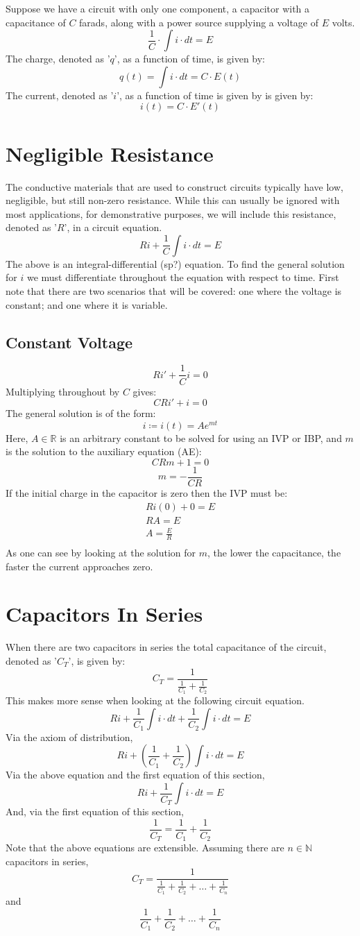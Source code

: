 \documentclass{article}
\begin{document}
	Suppose we have a circuit with only one component, a capacitor with a 
	capacitance of $C$ farads, along with a power source supplying a voltage of 
	$E$ volts.
	\[ \frac{1}{C}\cdot\int i \cdot dt = E\]
	The charge, denoted as '$q$', as a function of time, is given by:
	\[ q(t) = \int i \cdot dt = C \cdot E(t)\]
	The current, denoted as '$i$', as a function of time is given by is given 
	by:
	\[ i(t) = C \cdot E'(t)\]
	\section[Resistance]{Negligible Resistance}
	The conductive materials that are used to construct circuits typically have 
	low, negligible, but still non-zero resistance.  While this can usually be 
	ignored with most applications, for demonstrative purposes, we will include 
	this resistance, denoted as '$R$', in a circuit equation.
	\[ Ri + \frac{1}{C} \int i \cdot dt = E\]
	The above is an integral-differential (sp?) equation.  To find the general 
	solution for $i$ we must differentiate throughout the equation with respect 
	to time.  First note that there are two scenarios that will be covered: one 
	where the voltage is constant; and one where it is variable.
	\subsection[Constant V.]{Constant Voltage}
	\[ Ri' + \frac{1}{C} i = 0\]
	Multiplying throughout by $C$ gives:
	\[ CRi' + i = 0\]
	The general solution is of the form:
	\[ i\coloneqq i(t)=Ae^{mt}\]
	Here, $A \in \mathbb{R}$ is an arbitrary constant to be solved for using an 
	IVP or IBP, and $m$ is the solution to the auxiliary equation (AE):
	\[ CRm + 1 = 0\]
	\[ m = -\frac{1}{CR}\]
	If the initial charge in the capacitor is zero then the IVP must be:
	\begin{gather*}
	    Ri(0) + 0 = E\\
	    RA = E\\
	    A = \frac{E}{R}\\
	\end{gather*}
	As one can see by looking at the solution for $m$, the lower the 
	capacitance, the faster the current approaches zero.
	\section[Series]{Capacitors In Series}
	When there are two capacitors in series the total capacitance of the 
	circuit, denoted as '$C_T$', is given by:
	\[ C_T = \frac{1}{\frac{1}{C_1} + \frac{1}{C_2}}\]
	This makes more sense when looking at the following circuit equation.
	\[ Ri + \frac{1}{C_1} \int i \cdot dt + \frac{1}{C_2} \int i \cdot dt = E\]
	Via the axiom of distribution,
	\[ Ri + \left(\frac{1}{C_1} + \frac{1}{C_2}\right)\int i \cdot dt = E\]
	Via the above equation and the first equation of this section,
	\[ Ri + \frac{1}{C_T}\int i \cdot dt = E\]
	And, via the first equation of this section,
	\[ \frac{1}{C_T} = \frac{1}{C_1} + \frac{1}{C_2}\]
	Note that the above equations are extensible.  Assuming there are $n \in 
	\mathbb{N}$ capacitors in series, 
	\[ C_T = \frac{1}{\frac{1}{C_1} + \frac{1}{C_2} + \dots +
	\frac{1}{C_n}}\]
	and 
	\[ \frac{1}{C_1} + \frac{1}{C_2} + \dots + \frac{1}{C_n}\]
\end{document}

